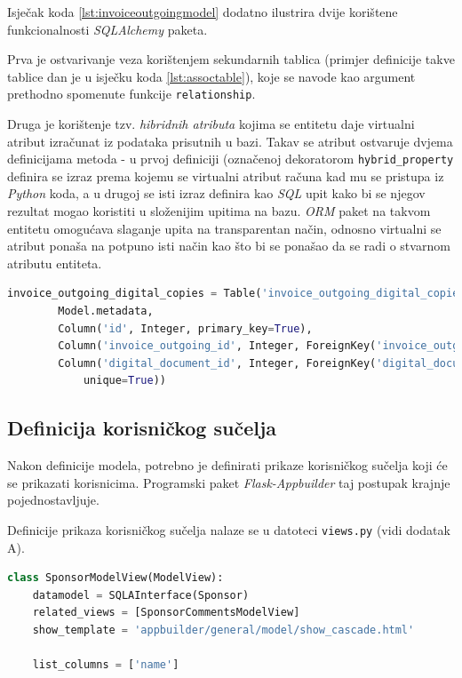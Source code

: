 \documentclass[times, utf8, diplomski]{fer}
\begin{document}
Isječak koda \ref{lst:invoiceoutgoingmodel} dodatno ilustrira dvije korištene
funkcionalnosti \emph{SQLAlchemy} paketa.

Prva je ostvarivanje veza korištenjem sekundarnih tablica (primjer definicije
takve tablice dan je u isječku koda \ref{lst:assoctable}), koje se navode kao
argument prethodno spomenute funkcije \texttt{relationship}.

Druga je korištenje tzv. \emph{hibridnih atributa} kojima se entitetu daje
virtualni atribut izračunat iz podataka prisutnih u bazi. Takav se atribut
ostvaruje dvjema definicijama metoda - u prvoj definiciji (označenoj dekoratorom
\texttt{hybrid\_property} definira se izraz
prema kojemu se virtualni atribut računa kad mu se pristupa iz \emph{Python}
koda, a u drugoj se isti izraz definira kao \emph{SQL} upit kako bi se njegov
rezultat mogao koristiti u složenijim upitima na bazu. \emph{ORM} paket na
takvom entitetu omogućava slaganje upita na transparentan način, odnosno
virtualni se atribut ponaša na potpuno isti način kao što bi se ponašao da se
radi o stvarnom atributu entiteta.

\begin{lstlisting}[language=Python,basicstyle=\scriptsize,frame=single,caption={
kod pomoćne tablice \emph{invoice\_outgoing\_digital\_copies}},label={lst:assoctable}]
invoice_outgoing_digital_copies = Table('invoice_outgoing_digital_copies',
        Model.metadata,
        Column('id', Integer, primary_key=True),
        Column('invoice_outgoing_id', Integer, ForeignKey('invoice_outgoing.id')),
        Column('digital_document_id', Integer, ForeignKey('digital_document.id'),
            unique=True))
\end{lstlisting}

\subsection{Definicija korisničkog sučelja}

Nakon definicije modela, potrebno je definirati prikaze korisničkog sučelja koji
će se prikazati korisnicima. Programski paket \emph{Flask-Appbuilder} taj
postupak krajnje pojednostavljuje.

Definicije prikaza korisničkog sučelja nalaze se u datoteci \texttt{views.py}
(vidi dodatak A).

\begin{lstlisting}[language=Python,basicstyle=\scriptsize,frame=single,caption={
kod prikaza \emph{SponsorModelView}},label={lst:modelview}]
class SponsorModelView(ModelView):
    datamodel = SQLAInterface(Sponsor)
    related_views = [SponsorCommentsModelView]
    show_template = 'appbuilder/general/model/show_cascade.html'

    list_columns = ['name']
\end{lstlisting}
\end{document}
